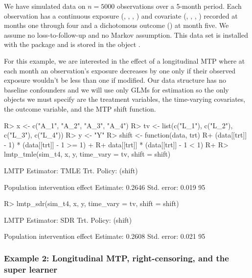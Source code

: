 \documentclass[]{jss}
\begin{document}
We have simulated data on \(n = 5000\) observations over a 5-month
period. Each observation has a continuous exposure (,
, , ) and covariate (,
, , ) recorded at months one through four
and a dichotomous outcome () at month five. We assume no
loss-to-follow-up and no Markov assumption. This data set is installed
with the package and is stored in the object .

For this example, we are interested in the effect of a longitudinal MTP
where at each month an observation's exposure decreases by one only if
their observed exposure wouldn't be less than one if modified. Our data
structure has no baseline confounders and we will use only GLMs for
estimation so the only objects we must specify are the treatment
variables, the time-varying covariates, the outcome variable, and the
MTP shift function.

\begin{CodeChunk}

\begin{CodeInput}
R> x <- c("A_1", "A_2", "A_3", "A_4")
R> tv <- list(c("L_1"), c("L_2"), c("L_3"), c("L_4"))
R> y <- "Y"
R> shift <- function(data, trt) {
R+   (data[[trt]] - 1) * (data[[trt]] - 1 >= 1) + 
R+     data[[trt]] * (data[[trt]] - 1 < 1)
R+ }
R> lmtp_tmle(sim_t4, x, y, time_vary = tv, shift = shift)
\end{CodeInput}

\begin{CodeOutput}
LMTP Estimator: TMLE
   Trt. Policy: (shift)

Population intervention effect
      Estimate: 0.2646
    Std. error: 0.019
        95%
\end{CodeOutput}

\begin{CodeInput}
R> lmtp_sdr(sim_t4, x, y, time_vary = tv, shift = shift)
\end{CodeInput}

\begin{CodeOutput}
LMTP Estimator: SDR
   Trt. Policy: (shift)

Population intervention effect
      Estimate: 0.2608
    Std. error: 0.021
        95%
\end{CodeOutput}

\end{CodeChunk}

\hypertarget{example-2-longitudinal-mtp-right-censoring-and-the-super-learner}{%
\subsubsection{Example 2: Longitudinal MTP, right-censoring, and the
super
learner}\label{example-2-longitudinal-mtp-right-censoring-and-the-super-learner}}
\end{document}
